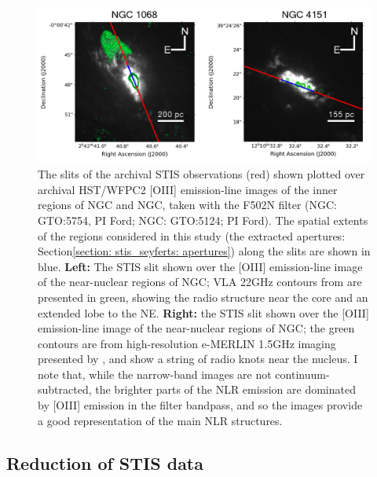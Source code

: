 \begin{figure}[!ht]
    \centering
    \includegraphics[width=1\linewidth]{figures/observations_and_data_reduction/seyferts_wfpc2.png}
    \caption[The slit positions of the archival HST/STIS observations plotted over archival {[}OIII{]} and radio-continuum imaging of NGC and NGC.]{The slits of the archival STIS observations (red) shown plotted over archival HST/WFPC2 [OIII] emission-line images of the inner regions of NGC and NGC, taken with the F502N filter (NGC: GTO:5754, PI Ford; NGC: GTO:5124; PI Ford). The spatial extents of the regions considered in this study (the extracted apertures: Section\;\ref{section: stis_seyferts: apertures}) along the slits are shown in blue. \textbf{Left:} The STIS slit shown over the [OIII] emission-line image of the near-nuclear regions of NGC; VLA 22\;GHz contours from \citet{Gallimore1996} are presented in green, showing the radio structure near the core and an extended lobe to the NE. \textbf{Right:} the STIS slit shown over the [OIII] emission-line image of the near-nuclear regions of NGC; the green contours are from high-resolution e-MERLIN 1.5\;GHz imaging presented by \citet{Williams2017}, and show a string of radio knots near the nucleus. I note that, while the narrow-band images are not continuum-subtracted, the brighter parts of the NLR emission are dominated by [OIII] emission in the filter bandpass, and so the images provide a good representation of the main NLR structures.}
    \label{fig: observations_and_data_reduction: stis_seyferts: observations: seyferts_wfpc2}
\end{figure}

\subsection{Reduction of STIS data}
\label{section: stis_seyferts: observations_and_data_reduction data_reduction}

